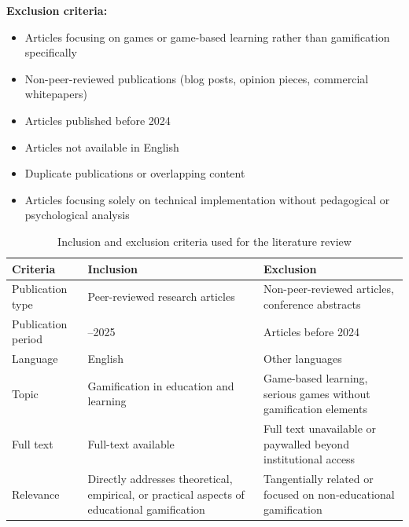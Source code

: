 \documentclass[12pt,a4paper]{article}
\begin{document}
\begin{justify}
\textbf{Exclusion criteria:}

\begin{itemize}
    \item Articles focusing on games or game-based learning rather than gamification specifically
    \item Non-peer-reviewed publications (blog posts, opinion pieces, commercial whitepapers)
    \item Articles published before 2024
    \item Articles not available in English
    \item Duplicate publications or overlapping content
    \item Articles focusing solely on technical implementation without pedagogical or psychological analysis
\end{itemize}

\end{justify}


\begin{table}[H]
\caption{Inclusion and exclusion criteria used for the literature review}
\label{tab:inclusion-exclusion}

\fontsize{10pt}{12pt}\selectfont

\begin{tabular}{|p{4cm}|p{5cm}|p{5cm}|}
\hline
\centering\textbf{Criteria} &
\centering\textbf{Inclusion} &
\centering\textbf{Exclusion}
\tabularnewline
\hline

\centering Publication type &
\centering Peer-reviewed research articles &
\centering Non-peer-reviewed articles, conference abstracts
\tabularnewline
\hline

\centering Publication period &
\centering 2024--2025 &
\centering Articles before 2024
\tabularnewline
\hline

\centering Language &
\centering English &
\centering Other languages
\tabularnewline
\hline

\centering Topic &
\centering Gamification in education and learning &
\centering Game-based learning, serious games without gamification elements
\tabularnewline
\hline

\centering Full text &
\centering Full-text available &
\centering Full text unavailable or paywalled beyond institutional access
\tabularnewline
\hline

\centering Relevance &
\centering Directly addresses theoretical, empirical, or practical aspects of educational gamification &
\centering Tangentially related or focused on non-educational gamification
\tabularnewline
\hline

\end{tabular}

\end{table}
\end{document}
